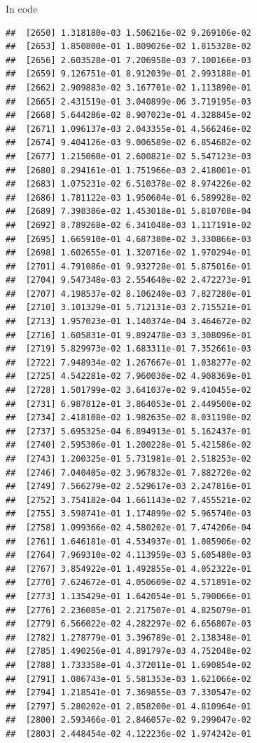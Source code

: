 \documentclass[ignorenonframetext,]{beamer}
\begin{document}
\begin{frame}[fragile]{In code}
\begin{verbatim}
##  [2650] 1.318180e-03 1.506216e-02 9.269106e-02
##  [2653] 1.850800e-01 1.809026e-02 1.815328e-02
##  [2656] 2.603528e-01 7.206958e-03 7.100166e-03
##  [2659] 9.126751e-01 8.912039e-01 2.993188e-01
##  [2662] 2.909883e-02 3.167701e-02 1.113890e-01
##  [2665] 2.431519e-01 3.040899e-06 3.719195e-03
##  [2668] 5.644286e-02 8.907023e-01 4.328845e-02
##  [2671] 1.096137e-03 2.043355e-01 4.566246e-02
##  [2674] 9.404126e-03 9.006589e-02 6.854682e-02
##  [2677] 1.215060e-01 2.600821e-02 5.547123e-03
##  [2680] 8.294161e-01 1.751966e-03 2.418001e-01
##  [2683] 1.075231e-02 6.510378e-02 8.974226e-02
##  [2686] 1.781122e-03 1.950604e-01 6.589928e-02
##  [2689] 7.398386e-02 1.453018e-01 5.810708e-04
##  [2692] 8.789268e-02 6.341048e-03 1.117191e-02
##  [2695] 1.665910e-01 4.687380e-02 3.330866e-03
##  [2698] 1.602655e-01 1.320716e-02 1.970294e-01
##  [2701] 4.791086e-01 9.932728e-01 5.875016e-01
##  [2704] 9.547348e-03 2.554640e-02 2.472273e-01
##  [2707] 4.198537e-02 8.106240e-03 7.827280e-01
##  [2710] 3.101329e-01 5.712131e-03 2.715521e-01
##  [2713] 1.957023e-01 1.140374e-04 3.464672e-02
##  [2716] 1.605831e-01 9.892478e-03 3.308096e-01
##  [2719] 5.829973e-02 1.683311e-01 7.352661e-03
##  [2722] 7.948934e-02 1.267667e-01 1.038277e-02
##  [2725] 4.542281e-02 7.960030e-02 4.908369e-01
##  [2728] 1.501799e-02 3.641037e-02 9.410455e-02
##  [2731] 6.987812e-01 3.864053e-01 2.449500e-02
##  [2734] 2.418108e-02 1.982635e-02 8.031198e-02
##  [2737] 5.695325e-04 6.894913e-01 5.162437e-01
##  [2740] 2.595306e-01 1.200228e-01 5.421586e-02
##  [2743] 1.200325e-01 5.731981e-01 2.518253e-02
##  [2746] 7.040405e-02 3.967832e-01 7.882720e-02
##  [2749] 7.566279e-02 2.529617e-03 2.247816e-01
##  [2752] 3.754182e-04 1.661143e-02 7.455521e-02
##  [2755] 3.598741e-01 1.174899e-02 5.965740e-03
##  [2758] 1.099366e-02 4.580202e-01 7.474206e-04
##  [2761] 1.646181e-01 4.534937e-01 1.085906e-02
##  [2764] 7.969310e-02 4.113959e-03 5.605480e-03
##  [2767] 3.854922e-01 1.492855e-01 4.052322e-01
##  [2770] 7.624672e-01 4.050609e-02 4.571891e-02
##  [2773] 1.135429e-01 1.642054e-01 5.790066e-01
##  [2776] 2.236085e-01 2.217507e-01 4.825079e-01
##  [2779] 6.566022e-02 4.282297e-02 6.656807e-03
##  [2782] 1.278779e-01 3.396789e-01 2.138348e-01
##  [2785] 1.490256e-01 4.891797e-03 4.752048e-02
##  [2788] 1.733358e-01 4.372011e-01 1.690854e-02
##  [2791] 1.086743e-01 5.581353e-03 1.621066e-02
##  [2794] 1.218541e-01 7.369855e-03 7.330547e-02
##  [2797] 5.280202e-01 2.858200e-01 4.810964e-01
##  [2800] 2.593466e-01 2.846057e-02 9.299047e-02
##  [2803] 2.448454e-02 4.122236e-02 1.974242e-01

\end{verbatim}
\end{frame}
\end{document}
